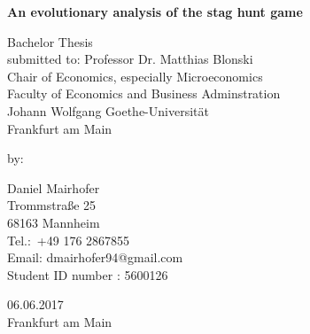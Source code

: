 \thispagestyle{empty}
\begin{center}
        \vspace{50mm}
	\textbf{\Huge An evolutionary analysis of the stag hunt game}\\
    \end{center}

\begin{center}
\vskip 1cm
	\large Bachelor Thesis
\\	
\vskip 2cm	
	submitted to:
\vskip 1cm
          Professor Dr. Matthias Blonski\\

          Chair of Economics, especially Microeconomics\\

          Faculty of Economics and Business Adminstration\\

          Johann Wolfgang Goethe-Universit\"at\\

          Frankfurt am Main


\vskip 1cm


by:  \\


\vskip 1cm



Daniel Mairhofer\\

Trommstraße 25\\

68163 Mannheim\\

Tel.:\ +49 176 2867855 \\

Email: dmairhofer94@gmail.com\\

Student ID number : 5600126\\


\end{center}

\vskip 2cm

\begin{center}

\large{06.06.2017} \\

\large{Frankfurt am Main}

\end{center}



